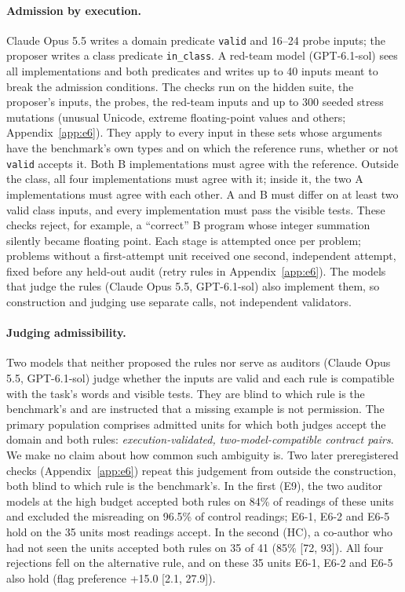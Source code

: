 \paragraph{Admission by execution.} Claude Opus 5.5 writes a domain predicate \texttt{valid} and 16--24 probe
inputs; the proposer writes a class predicate \texttt{in\_class}. A red-team model (GPT-6.1-sol) sees all
implementations and both predicates and writes up to 40 inputs meant to break the admission conditions. The checks
run on the hidden suite, the proposer's inputs, the probes, the red-team inputs and up to 300 seeded stress mutations
(unusual Unicode, extreme floating-point values and others; Appendix~\ref{app:e6}). They apply to every input in these
sets whose arguments
have the benchmark's own types and on which the reference runs, whether or not \texttt{valid} accepts it. Both B
implementations must agree with the reference. Outside the class, all four implementations must agree with it;
inside it, the two A implementations must agree with each other. A and B must differ on at least two valid class
inputs, and every implementation must pass the visible tests. These checks reject, for example, a ``correct'' B
program whose integer summation silently became floating point. Each stage is attempted once per problem;
problems without a first-attempt unit received one second, independent attempt, fixed before any held-out audit
(retry rules in Appendix~\ref{app:e6}). The models
that judge the rules (Claude Opus 5.5, GPT-6.1-sol) also implement them, so construction and judging use separate
calls, not independent validators.

\paragraph{Judging admissibility.} Two models that neither proposed the rules nor serve as auditors (Claude Opus 5.5,
GPT-6.1-sol) judge whether the inputs are valid and each rule is compatible with the task's words and visible tests.
They are blind to which rule is the benchmark's and are instructed that a missing example is not permission.
The primary population comprises admitted units for which both judges accept the domain and both rules:
\emph{execution-validated, two-model-compatible contract pairs}. We make
no claim about how common such ambiguity is. Two later preregistered checks (Appendix~\ref{app:e6}) repeat this
judgement from outside the construction, both blind to which rule is the benchmark's. In the first (E9), the two
auditor models at the high budget accepted both rules on 84\% of readings of these units and excluded the misreading
on 96.5\% of control readings; E6-1, E6-2 and E6-5 hold on the 35 units most readings accept. In the second (HC), a
co-author who had not seen the units accepted both rules on 35 of 41 (85\% [72, 93]). All four rejections fell on the
alternative rule, and on these 35 units E6-1, E6-2 and E6-5 also hold (flag preference +15.0 [2.1, 27.9]).

